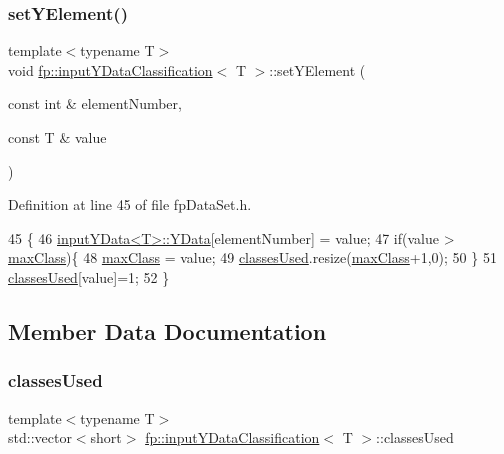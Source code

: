 \subsubsection{\texorpdfstring{set\+Y\+Element()}{setYElement()}}
{\footnotesize\ttfamily template$<$typename T$>$ \\
void \hyperlink{classfp_1_1inputYDataClassification}{fp\+::input\+Y\+Data\+Classification}$<$ T $>$\+::set\+Y\+Element (\begin{DoxyParamCaption}\item[{const int \&}]{element\+Number,  }\item[{const T \&}]{value }\end{DoxyParamCaption})\hspace{0.3cm}{\ttfamily [inline]}}



Definition at line 45 of file fp\+Data\+Set.\+h.


\begin{DoxyCode}
45                                                                          \{
46             \hyperlink{classfp_1_1inputYData_af9a5f5190739918b5b5b209ef3b18de3}{inputYData<T>::YData}[elementNumber] = value;
47             \textcolor{keywordflow}{if}(value > \hyperlink{classfp_1_1inputYDataClassification_a5edb210f521aebaaf8d73b5c9ef68cf1}{maxClass})\{
48                 \hyperlink{classfp_1_1inputYDataClassification_a5edb210f521aebaaf8d73b5c9ef68cf1}{maxClass} = value;
49                 \hyperlink{classfp_1_1inputYDataClassification_ad204a3c72d6b85884552f262ba9cf7fc}{classesUsed}.resize(\hyperlink{classfp_1_1inputYDataClassification_a5edb210f521aebaaf8d73b5c9ef68cf1}{maxClass}+1,0);
50             \}
51             \hyperlink{classfp_1_1inputYDataClassification_ad204a3c72d6b85884552f262ba9cf7fc}{classesUsed}[value]=1;
52         \}
\end{DoxyCode}


\subsection{Member Data Documentation}
\mbox{\label{classfp_1_1inputYDataClassification_ad204a3c72d6b85884552f262ba9cf7fc}} 
\subsubsection{\texorpdfstring{classes\+Used}{classesUsed}}
{\footnotesize\ttfamily template$<$typename T$>$ \\
std\+::vector$<$short$>$ \hyperlink{classfp_1_1inputYDataClassification}{fp\+::input\+Y\+Data\+Classification}$<$ T $>$\+::classes\+Used\hspace{0.3cm}{\ttfamily [private]}}



